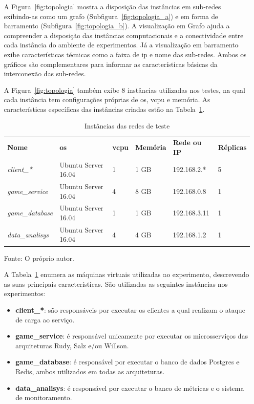 A Figura~\ref{fig:topologia} mostra a disposição das instâncias em sub-redes exibindo-as como um grafo (Subfigura~\ref{fig:topologia_a}) e em forma de barramento (Subfigura~\ref{fig:topologia_b}).
%
A visualização em Grafo ajuda a compreender a disposição das instâncias computacionais e a conectividade entre cada instância do ambiente de experimentos.
%
Já a visualização em barramento exibe características técnicas como a faixa de \ac{ip} e nome das sub-redes.
%
Ambos os gráficos são complementares para informar as características básicas da interconexão das sub-redes.

A Figura~\ref{fig:topologia} também exibe 8 instâncias utilizadas nos testes, na qual cada instância tem configurações próprias de \ac{os}, \acs{vcpu} e memória.
%
As características específicas das instâncias criadas estão na Tabela~\ref{tab:instancias}.

\begin{table}[htb!]
    \centering
    \caption{Instâncias das redes de teste}
    \label{tab:instancias}
    \begin{tabular}{|l|l|l|l|l|l|}
        \hline
        Nome                    & \ac{os}             &\acs{vcpu}& Memória & Rede ou IP   & Réplicas \\ \hline
        \textit{client\_*}      & Ubuntu Server 16.04 & 1        & 1 GB    & 192.168.2.*  & 5        \\ \hline
        \textit{game\_service}  & Ubuntu Server 16.04 & 4        & 8 GB    & 192.168.0.8  & 1        \\ \hline
        \textit{game\_database} & Ubuntu Server 16.04 & 1        & 1 GB    & 192.168.3.11 & 1        \\ \hline
        \textit{data\_analisys} & Ubuntu Server 16.04 & 4        & 4 GB    & 192.168.1.2  & 1        \\ \hline
    \end{tabular}

    Fonte: O próprio autor.
\end{table}

A Tabela~\ref{tab:instancias} enumera as máquinas virtuais utilizadas no experimento, descrevendo as suas principais características.
%
São utilizadas as seguintes instâncias nos experimentos:

\begin{itemize}
    \item \textbf{client\_*}: são responsáveis por executar os clientes a qual realizam o ataque de carga ao serviço.
    \item \textbf{game\_service}: é responsável unicamente por executar os microsserviços das arquiteturas Rudy, Salz e/ou Willson.
    \item \textbf{game\_database}: é responsável por executar o banco de dados Postgres e Redis, ambos utilizados em todas as arquiteturas.
    \item \textbf{data\_analisys}: é responsável por executar o banco de métricas e o sistema de monitoramento.
\end{itemize}

